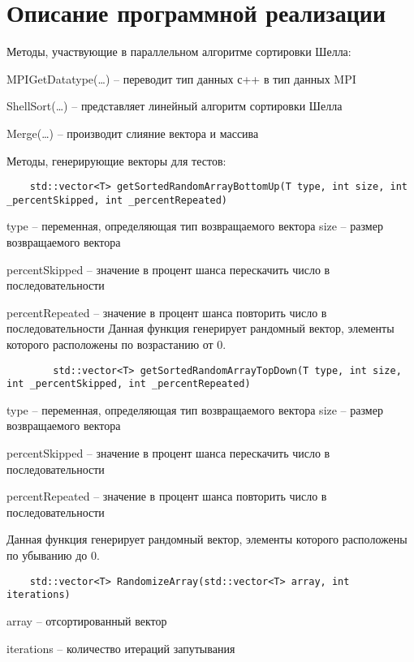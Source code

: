 \documentclass{report}
\begin{document}
\section*{Описание программной реализации}
Методы, участвующие в параллельном алгоритме сортировки Шелла:
\par
MPIGetDatatype(…) – переводит тип данных с++ в тип данных MPI
\par
ShellSort(…) – представляет линейный алгоритм сортировки Шелла
\par
Merge(…) – производит слияние вектора и массива 
\par
Методы, генерирующие векторы для тестов:


\begin{lstlisting}
	std::vector<T> getSortedRandomArrayBottomUp(T type, int size, int
_percentSkipped, int _percentRepeated)
\end{lstlisting}
\par
type – переменная, определяющая тип возвращаемого вектора size – размер возвращаемого вектора
\par
percentSkipped – значение в процент шанса перескачить число в последовательности
\par
percentRepeated – значение в процент шанса повторить число в последовательности Данная функция генерирует рандомный вектор, элементы которого расположены по возрастанию от 0.

\begin{lstlisting}
		std::vector<T> getSortedRandomArrayTopDown(T type, int size, int _percentSkipped, int _percentRepeated)
\end{lstlisting}
\par
type – переменная, определяющая тип возвращаемого вектора size – размер возвращаемого вектора
\par
percentSkipped – значение в процент шанса перескачить число в последовательности
\par
percentRepeated – значение в процент шанса повторить число в последовательности
\par
Данная функция генерирует рандомный вектор, элементы которого расположены по убыванию до 0.

\begin{lstlisting}
	std::vector<T> RandomizeArray(std::vector<T> array, int iterations) 
\end{lstlisting}
\par
array – отсортированный вектор
\par
iterations – количество итераций запутывания
\end{document}
